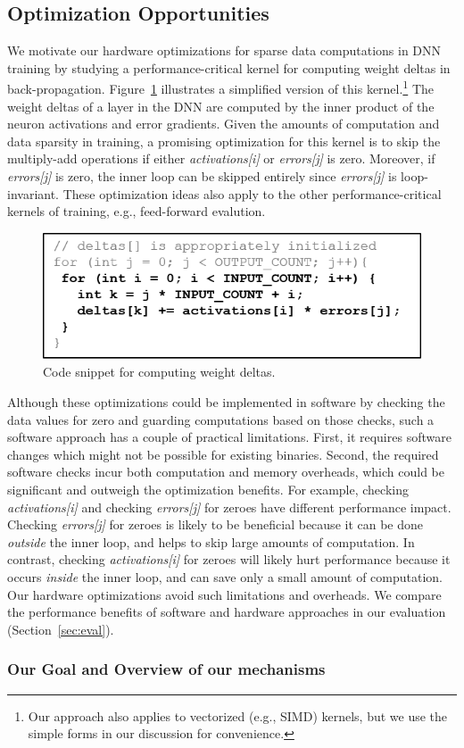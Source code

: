 \subsection{Optimization Opportunities}
\label{subsec:sparse_code_oppor}
We motivate our hardware optimizations for sparse data computations in DNN training by studying a performance-critical kernel for computing weight deltas in back-propagation.  Figure~\ref{fig:deltas_source_code} illustrates a simplified version of this kernel.\footnote{Our approach also applies to vectorized (e.g., SIMD) kernels, but we use the simple forms in our discussion for convenience.}   The weight deltas of a layer in the DNN are computed by the inner product of the neuron activations and error gradients.  Given the amounts of computation and data sparsity in training, a promising optimization for this kernel is to skip the multiply-add operations if either \emph{activations[i]} or \emph{errors[j]} is zero.  Moreover,  if \emph{errors[j]} is zero, the inner loop can be skipped entirely since \emph{errors[j]} is loop-invariant. These optimization ideas also apply to the other performance-critical kernels of training, e.g., feed-forward evalution. 

\begin{figure}[h]
 \centering
 \includegraphics[width=.9\columnwidth]{Figures/deltas_source_code.png}
\caption{Code snippet for computing weight deltas.}
 \label{fig:deltas_source_code}
 \end{figure}

Although these optimizations could be implemented in software by checking the data values for zero and guarding computations based on those checks, such a software approach has a couple of practical limitations.   First, it requires software changes which might not be possible for existing binaries.   Second, the required software checks incur both computation and memory overheads, which could be significant and outweigh the optimization benefits.  For example, checking \emph{activations[i]} and checking \emph{errors[j]} for zeroes have different performance impact.  Checking \emph{errors[j]} for zeroes is likely to be beneficial because it can be done \emph{outside} the inner loop, and helps to skip large amounts of computation. In contrast, checking \emph{activations[i]} for zeroes will likely hurt performance because it occurs \emph{inside} the inner loop, and can save only a small amount of computation. Our hardware optimizations  avoid such limitations and overheads.  We compare the performance benefits of software and hardware approaches in our evaluation (Section~\ref{sec:eval}). 


\subsubsection{Our Goal and Overview of our mechanisms}

